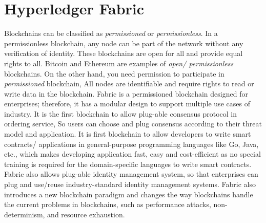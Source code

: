 \section{Hyperledger Fabric}
Blockchains can be classified as \textit{permissioned} or \textit{permissionless}. In a permissionless blockchain, any node can be part of the network without any verification of identity. These blockchains are open for all and provide equal rights to all. Bitcoin and  Ethereum are examples of \textit{open/ permissionless} blockchains. On the other hand, you need permission to participate in \textit{permissioned} blockchain, All nodes are identifiable and require rights to read or write data in the blockchain.
Fabric\cite{androulaki2018hyperledger} is a permissioned blockchain designed for enterprises; therefore, it has a modular design to support multiple use cases of industry. It is the first blockchain to allow plug-able consensus protocol in ordering service, So users can choose and plug consensus according to their threat model and application. It is first blockchain to allow developers to write smart contracts/ applications in general-purpose programming languages like Go, Java, etc., which makes developing application fast, easy and cost-efficient as no special training is required for the domain-specific languages to write smart contracts. Fabric also allows plug-able identity management system, so that enterprises can plug and use/reuse industry-standard identity management systems. Fabric also introduces a new blockchain paradigm and changes the way blockchains handle the current problems in blockchains, such as performance attacks, non-determinism, and resource exhaustion.\cite{use_fabric}


